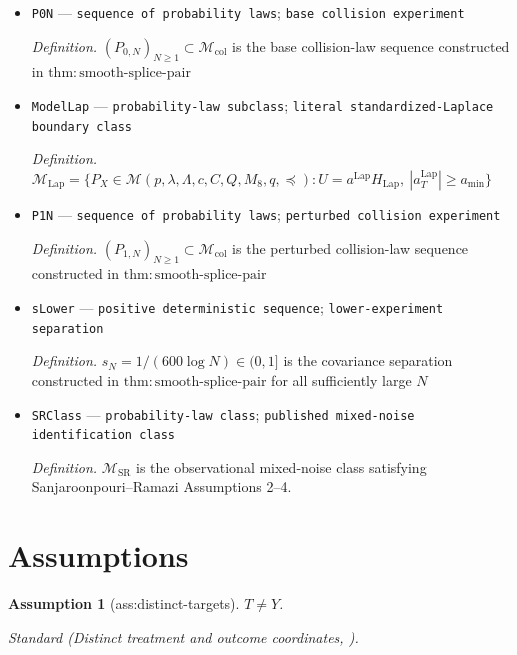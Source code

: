 \documentclass{article}
\newtheorem{assumption}{Assumption}
\begin{document}
\begin{itemize}
  \item \texttt{P0N} --- \texttt{sequence of probability laws}; \texttt{base collision experiment}
  \par\smallskip\noindent\emph{Definition.} \((P_{0,N})_{N\ge1}\subset\mathcal M_{\mathrm{col}}\) is the base collision-law sequence constructed in \(\mathrm{thm:smooth\text{-}splice\text{-}pair}\)
  \item \texttt{ModelLap} --- \texttt{probability-\allowbreak{}law subclass}; \texttt{literal standardized-\allowbreak{}Laplace boundary class}
  \par\smallskip\noindent\emph{Definition.} \(\mathcal M_{\mathrm{Lap}}=\{P_X\in\mathcal M(p,\lambda,\Lambda,c,C,Q,M_8,q,\preceq):U=a^{\mathrm{Lap}}H_{\mathrm{Lap}},\ |a_T^{\mathrm{Lap}}|\ge a_{\min}\}\)
  \item \texttt{P1N} --- \texttt{sequence of probability laws}; \texttt{perturbed collision experiment}
  \par\smallskip\noindent\emph{Definition.} \((P_{1,N})_{N\ge1}\subset\mathcal M_{\mathrm{col}}\) is the perturbed collision-law sequence constructed in \(\mathrm{thm:smooth\text{-}splice\text{-}pair}\)
  \item \texttt{sLower} --- \texttt{positive deterministic sequence}; \texttt{lower-\allowbreak{}experiment separation}
  \par\smallskip\noindent\emph{Definition.} \(s_N=1/(600\log N)\in(0,1]\) is the covariance separation constructed in \(\mathrm{thm:smooth\text{-}splice\text{-}pair}\) for all sufficiently large \(N\)
  \item \texttt{SRClass} --- \texttt{probability-\allowbreak{}law class}; \texttt{published mixed-\allowbreak{}noise identification class}
  \par\smallskip\noindent\emph{Definition.} \(\mathcal M_{\mathrm{SR}}\) is the observational mixed-noise class satisfying Sanjaroonpouri--Ramazi Assumptions 2--4.
\end{itemize}

\section{Assumptions}

\begin{assumption}[ass:distinct-targets]\label{ass:distinct-targets}
\(T\ne Y\).
\par\smallskip\noindent\emph{Standard} (Distinct treatment and outcome coordinates, \cite{PerkovicKalischMaathuis2017}).
\end{assumption}
\end{document}
